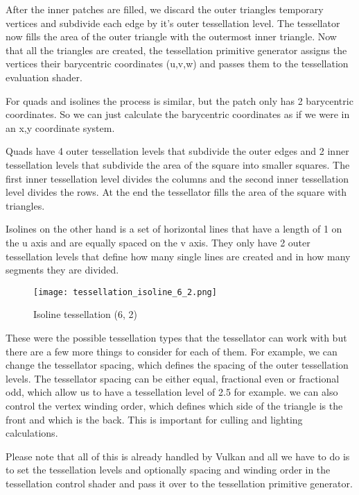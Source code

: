 \documentclass[12pt]{report} \usepackage{preamble}
\begin{document}
After the inner patches are filled, we discard the outer triangles temporary vertices
and subdivide each edge by it's outer tessellation level.
The tessellator now fills the area of the outer triangle with the outermost inner triangle.
Now that all the triangles are created, the tessellation primitive generator assigns
the vertices their barycentric coordinates (u,v,w)
and passes them to the tessellation evaluation shader. \cite{tessellation}

For quads and isolines the process is similar, but the patch only has 2 barycentric coordinates.
So we can just calculate the barycentric coordinates as if we were in
an x,y coordinate system. \cite{tessellation}

Quads have 4 outer tessellation levels that subdivide the outer edges
and 2 inner tessellation levels that subdivide the area of the square
into smaller squares. The first inner tessellation level divides the columns
and the second inner tessellation level divides the rows.
At the end the tessellator fills the area of the square with triangles. \cite{tessellation}

Isolines on the other hand is a set of horizontal lines that have a length
of 1 on the u axis and are equally spaced on the v axis.
They only have 2 outer tessellation levels that define how many single lines
are created and in how many segments they are divided.

\begin{figure}[hbtp]
	\centering \texttt{[image: tessellation\_isoline\_6\_2.png]}
	\caption{Isoline tessellation (6, 2)}
	\cite{fig:isoline}
\end{figure} \floatbarrier

These were the possible tessellation types that the tessellator
can work with but there are a few more things to consider for each of them.
For example, we can change the tessellator spacing,
which defines the spacing of the outer tessellation levels.
The tessellator spacing can be either equal, fractional even or fractional odd,
which allow us to have a tessellation level of 2.5 for example. \cite{tessellation}
we can also control the vertex winding order, which defines which side of the triangle
is the front and which is the back. This is important
for culling and lighting calculations. \cite{tessellation}

Please note that all of this is already handled by Vulkan
and all we have to do is to set the tessellation levels and optionally spacing
and winding order in the tessellation control shader and pass it over
to the tessellation primitive generator. \cite{tessellation}
\end{document}
